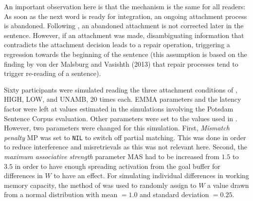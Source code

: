 \documentclass{cambridge7A}\usepackage[]{graphicx}\usepackage[]{color}
\begin{document}
An important observation here is that the mechanism is the same for all readers: As soon as the next word is ready for integration, an ongoing attachment process is abandoned. %
Following \cite{SwetsDesmetClifton2008}, an abandoned attachment is not corrected later in the sentence. However, if an attachment was made, disambiguating information that contradicts the attachment decision leads to a repair operation, triggering a regression towards the beginning of the sentence (this assumption is based on the finding by von der Malsburg and Vasishth (2013) that repair processes tend to trigger re-reading of a sentence).



Sixty participants were simulated reading the three attachment conditions of \cite{MalsburgVasishth2013}, HIGH, LOW, and UNAMB, 20 times each.
EMMA parameters and the latency factor were left at values estimated in the simulations involving the Potsdam Sentence Corpus evaluation. Other parameters were set to the values used in \cite{LewisVasishth2005}. However, two parameters were changed for this simulation. First, \emph{Mismatch penalty} MP was set to \texttt{NIL} to switch off partial matching. This was done in order to reduce interference and misretrievals as this was not relevant here. Second, the \emph{maximum associative strength} parameter MAS had to be increased from $1.5$ to $3.5$ in order to have enough spreading activation from the goal buffer for differences in $W$ to have an effect.
For simulating individual differences in working memory capacity, the method of \cite{DailyLovettReder2001} was used to randomly assign to $W$ a value drawn from a normal distribution with mean $=1.0$ and standard deviation $=0.25$. 
\end{document}
